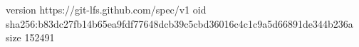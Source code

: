 version https://git-lfs.github.com/spec/v1
oid sha256:b83dc27fb14b65ea9fdf77648dcb39c5cbd36016c4c1c9a5d66891de344b236a
size 152491
